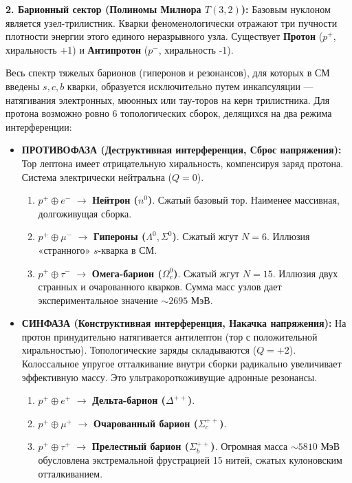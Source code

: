 \documentclass[11pt,a4paper]{article}
\begin{document}
	\textbf{2. Барионный сектор (Полиномы Милнора $T(3,2)$):}
	Базовым нуклоном является узел-трилистник. Кварки феноменологически отражают три пучности плотности энергии этого единого неразрывного узла. Существует \textbf{Протон} ($p^+$, хиральность +1) и \textbf{Антипротон} ($p^-$, хиральность -1).
	
	Весь спектр тяжелых барионов (гиперонов и резонансов), для которых в СМ введены $s, c, b$ кварки, образуется исключительно путем инкапсуляции — натягивания электронных, мюонных или тау-торов на керн трилистника. Для протона возможно ровно 6 топологических сборок, делящихся на два режима интерференции:
	\begin{itemize}
		\item \textbf{ПРОТИВОФАЗА (Деструктивная интерференция, Сброс напряжения):} Тор лептона имеет отрицательную хиральность, компенсируя заряд протона. Система электрически нейтральна ($Q=0$). 
		\begin{enumerate}
			\item $p^+ \oplus e^-$ $\longrightarrow$ \textbf{Нейтрон ($n^0$)}. Сжатый базовый тор. Наименее массивная, долгоживущая сборка.
			\item $p^+ \oplus \mu^-$ $\longrightarrow$ \textbf{Гипероны ($\Lambda^0, \Sigma^0$)}. Сжатый жгут $N=6$. Иллюзия «странного» $s$-кварка в СМ.
			\item $p^+ \oplus \tau^-$ $\longrightarrow$ \textbf{Омега-барион ($\Omega_c^0$)}. Сжатый жгут $N=15$. Иллюзия двух странных и очарованного кварков. Сумма масс узлов дает экспериментальное значение $\sim 2695$ МэВ.
		\end{enumerate}
		
		\item \textbf{СИНФАЗА (Конструктивная интерференция, Накачка напряжения):} На протон принудительно натягивается антилептон (тор с положительной хиральностью). Топологические заряды складываются ($Q=+2$). Колоссальное упругое отталкивание внутри сборки радикально увеличивает эффективную массу. Это ультракороткоживущие адронные резонансы.
		\begin{enumerate}
			\item $p^+ \oplus e^+$ $\longrightarrow$ \textbf{Дельта-барион ($\Delta^{++}$)}.
			\item $p^+ \oplus \mu^+$ $\longrightarrow$ \textbf{Очарованный барион ($\Sigma_c^{++}$)}.
			\item $p^+ \oplus \tau^+$ $\longrightarrow$ \textbf{Прелестный барион ($\Sigma_b^{++}$)}. Огромная масса $\sim 5810$ МэВ обусловлена экстремальной фрустрацией 15 нитей, сжатых кулоновским отталкиванием.
		\end{enumerate}
	\end{itemize}
	
\end{document}
